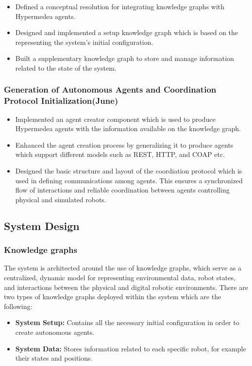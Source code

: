 \documentclass{article} %
\begin{document}
\begin{itemize}
     \item Defined a conceptual resolution for integrating knowledge graphs with Hypermedea agents.
     
    \item Designed and implemented a setup knowledge graph which is based on the representing the system's initial configuration.

    \item  Built a supplementary knowledge graph to store and manage information related to the state of the system.
\end{itemize}

\subsubsection{Generation of Autonomous Agents and Coordination Protocol Initialization(June)}
\begin{itemize}
    \item Implemented an agent creator component which is used to produce Hypermedea agents with the information available on the  knowledge graph.

    \item  Enhanced the agent creation process by generalizing it to  produce agents which support different models such as REST, HTTP, and COAP etc.

     \item  Designed the basic structure and layout of the coordiation protocol which is used in defining communications among agents. This ensures a synchronized flow of interactions and reliable coordination between agents controlling physical and simulated robots.

\end{itemize}

\subsection{System Design}
\subsubsection{Knowledge graphs}
The system is architected around the use of  knowledge graphs, which serve as a centralized, dynamic model for representing environmental data, robot states, and interactions between the physical and digital robotic environments. There are two types of knowledge graphs deployed within the system which are the following:
\begin{itemize}
  \item \textbf{System Setup:}  Contains all the necessary initial configuration in order to create autonomous agents.
  
  \item \textbf{System Data:} Stores information related to each specific robot, for example their states and positions.
  
\end{itemize}
\end{document}
